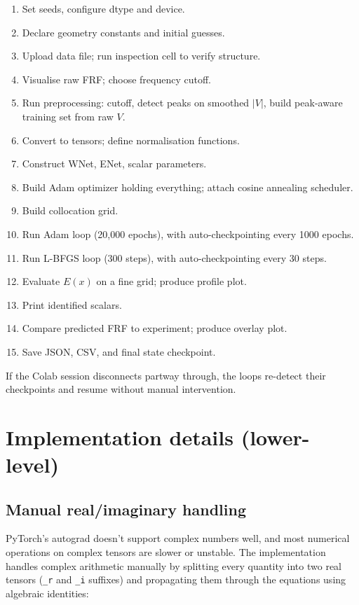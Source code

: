 \documentclass[11pt,a4paper]{article}
\begin{document}
\begin{enumerate}[leftmargin=*, itemsep=2pt]
\item Set seeds, configure dtype and device.
\item Declare geometry constants and initial guesses.
\item Upload data file; run inspection cell to verify structure.
\item Visualise raw FRF; choose frequency cutoff.
\item Run preprocessing: cutoff, detect peaks on smoothed $|V|$, build peak-aware training set from raw $V$.
\item Convert to tensors; define normalisation functions.
\item Construct WNet, ENet, scalar parameters.
\item Build Adam optimizer holding everything; attach cosine annealing scheduler.
\item Build collocation grid.
\item Run Adam loop (20{,}000 epochs), with auto-checkpointing every 1000 epochs.
\item Run L-BFGS loop (300 steps), with auto-checkpointing every 30 steps.
\item Evaluate $E(x)$ on a fine grid; produce profile plot.
\item Print identified scalars.
\item Compare predicted FRF to experiment; produce overlay plot.
\item Save JSON, CSV, and final state checkpoint.
\end{enumerate}

If the Colab session disconnects partway through, the loops re-detect their checkpoints and resume without manual intervention.

\section{Implementation details (lower-level)}
\label{sec:impl_details}

\subsection{Manual real/imaginary handling}

PyTorch's autograd doesn't support complex numbers well, and most numerical operations on complex tensors are slower or unstable. The implementation handles complex arithmetic manually by splitting every quantity into two real tensors (\texttt{\_r} and \texttt{\_i} suffixes) and propagating them through the equations using algebraic identities:
\end{document}

